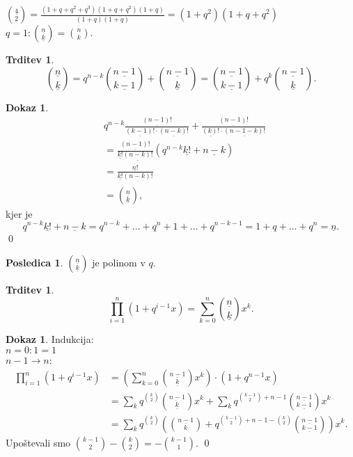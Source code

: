 \documentclass[a4paper, 12pt]{book}
\theoremstyle{definition}
\newtheorem{conseq}[counter]{Posledica}
\newtheorem{claim}[counter]{Trditev}
\newtheorem{pro}[counter]{Dokaz}
\theoremstyle{remark}
\begin{document}
$\binom{\underline{4}}{\underline{2}} = \frac{(1 + q + q^2 + q^3)(1 + q + q^2) (1 + q)}{(1 + q)(1 + q)} = (1 + q^2) (1 + q + q^2)$
$q = 1: \binom{\underline{n}}{\underline{k}} = \binom{n}{k}$.
\begin{claim}
  \begin{equation*}
    \binom{\underline{n}}{\underline{k}}
    = q^{n-k} \binom{\underline{n-1}}{\underline{k-1}} + \binom{\underline{n-1}}{\underline{k}}
    = \binom{\underline{n-1}}{\underline{k-1}} + q^k \binom{\underline{n-1}}{\underline{k}}.
  \end{equation*}
\end{claim}
\begin{pro}
  \begin{align*}
    &q^{n-k} \frac{\underline{(n-1)!}}{\underline{(k-1)!} \cdot \underline{(n-k)!}} +
      \frac{\underline{(n-1)!}}{\underline{(k)!} \cdot \underline{(n-1-k)!}} \\
    &= \frac{\underline{(n-1)!}}{\underline{k!} \underline{(n-k)!}} (q^{n-k} \underline{k!} + \underline{n-k}) \\
    &= \frac{\underline{n!}}{\underline{k!} \underline{(n-k)!}} \\
    &= \binom{\underline{n}}{\underline{k}},
  \end{align*}
  kjer je
  \begin{equation*}
    q^{n-k} \underline{k!} + \underline{n-k} = q^{n-k} + \dots + q^n + 1 + \dots + q^{n-k-1} = 1 + q + \dots + q^n
    = \underline{n}.
  \end{equation*}
  \qed
\end{pro}
\begin{conseq}
  $\binom{\underline{n}}{\underline{k}}$ je polinom v $q$.
\end{conseq}
\begin{claim}
  \begin{equation*}
    \prod_{i=1}^{n} (1 + q^{i-1}x) = \sum_{k=0}^{n} \binom{\underline{n}}{\underline{k}} x^k.
  \end{equation*}
\end{claim}
\begin{pro}
  Indukcija: \\
  $n = 0: 1 = 1$ \\
  $n - 1 \to n$:
  \begin{align*}
    \prod_{i=1}^{n} (1 + q^{i-1}x) &= \left(\sum_{k=0}^{n} \binom{\underline{n-1}}{\underline{k}} x^k\right) \cdot (1 + q^{n-1}x) \\
    &= \sum_k q^{\binom{k}{2}} \binom{\underbar{n-1}}{\underline{k}} x^k
      + \sum_k q^{\binom{k-1}{2}+n-1} \binom{\underline{n-1}}{\underline{k-1}} x^k \\
    &= \sum_k q^{\binom{k}{2}} \left(\binom{\underline{n-1}}{k} +
      q^{\binom{k-1}{2}+n-1-\binom{k}{2}} \binom{\underline{n-1}}{\underline{k-1}}\right) x^k.
  \end{align*}
  Upoštevali smo $\binom{k-1}{2} - \binom{k}{2} = - \binom{k-1}{1}$.
  \qed
\end{pro}
\end{document}
